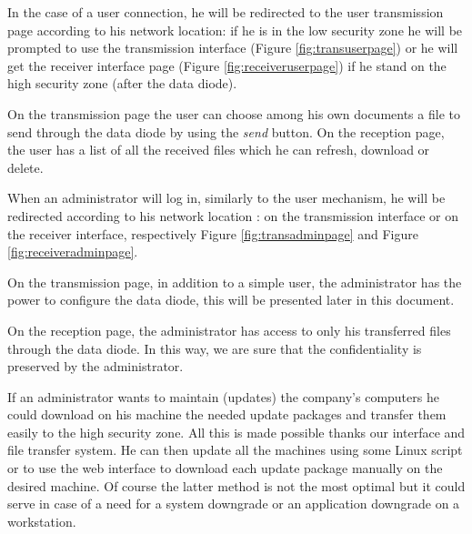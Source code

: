 \documentclass[a4paper,10pt]{article}
\begin{document}
In the case of a user connection, he will be redirected to the user transmission page according to his network location: if he is in the low security zone he will be prompted to use the transmission interface (Figure \ref{fig:transuserpage}) or he will get the receiver interface page (Figure \ref{fig:receiveruserpage}) if he stand on the high security zone (after the data diode). 

On the transmission page the user can choose among his own documents a file to send through the data diode by using the \textit{send} button. On the reception page, the user has a list of all the received files which he can refresh, download or delete.\bigskip 

When an administrator will log in, similarly to the user mechanism, he will be redirected according to his network location : on the transmission interface or on the receiver interface, respectively Figure \ref{fig:transadminpage} and Figure \ref{fig:receiveradminpage}.

On the transmission page, in addition to a simple user, the administrator has the power to configure the data diode, this will be presented later in this document.

On the reception page, the administrator has access to only his transferred files through the data diode. In this way, we are sure that the confidentiality is preserved by the administrator.  

If an administrator wants to maintain (updates) the company's computers he could download on his machine the needed update packages and transfer them easily to the high security zone. All this is made possible thanks our interface and file transfer system. He can then update all the machines using some Linux script or to use the web interface to download each update package manually on the desired machine. Of course the latter method is not the most optimal but it could serve in case of a need for a system downgrade or an application downgrade on a workstation. 
\end{document}
